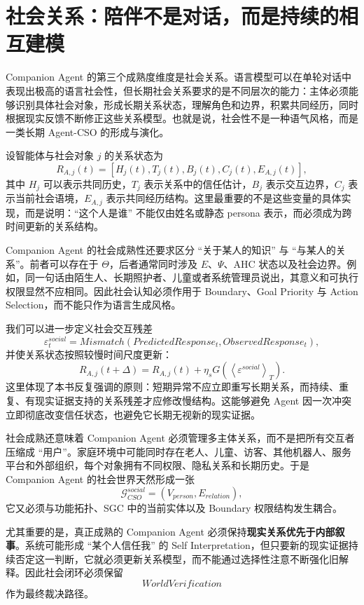 \section{社会关系：陪伴不是对话，而是持续的相互建模}

Companion Agent 的第三个成熟度维度是社会关系。语言模型可以在单轮对话中表现出极高的语言社会性，但长期社会关系要求的是不同层次的能力：主体必须能够识别具体社会对象，形成长期关系状态，理解角色和边界，积累共同经历，同时根据现实反馈不断修正这些关系模型。也就是说，社会性不是一种语气风格，而是一类长期 Agent-CSO 的形成与演化。

设智能体与社会对象 $j$ 的关系状态为
\[
R_{A,j}(t)
=
\left[
H_{j}(t),
T_{j}(t),
B_{j}(t),
C_{j}(t),
E_{A,j}(t)
\right],
\]
其中 $H_j$ 可以表示共同历史，$T_j$ 表示关系中的信任估计，$B_j$ 表示交互边界，$C_j$ 表示当前社会语境，$E_{A,j}$ 表示共同经历结构。这里最重要的不是这些变量的具体实现，而是说明：``这个人是谁'' 不能仅由姓名或静态 persona 表示，而必须成为跨时间更新的关系结构。

Companion Agent 的社会成熟性还要求区分 ``关于某人的知识'' 与 ``与某人的关系''。前者可以存在于 $\Theta$，后者通常同时涉及 $E$、$\Psi$、AHC 状态以及社会边界。例如，同一句话由陌生人、长期照护者、儿童或者系统管理员说出，其意义和可执行权限显然不应相同。因此社会认知必须作用于 Boundary、Goal Priority 与 Action Selection，而不能只作为语言生成风格。

我们可以进一步定义社会交互残差
\[
\varepsilon^{social}_t
=
Mismatch
\left(
PredictedResponse_t,
ObservedResponse_t
\right),
\]
并使关系状态按照较慢时间尺度更新：
\[
R_{A,j}(t+\Delta)
=
R_{A,j}(t)
+
\eta_s
G
\left(
\left\langle
\varepsilon^{social}
\right\rangle_T
\right).
\]
这里体现了本书反复强调的原则：短期异常不应立即重写长期关系，而持续、重复、有现实证据支持的关系残差才应修改慢结构。这能够避免 Agent 因一次冲突立即彻底改变信任状态，也避免它长期无视新的现实证据。

社会成熟还意味着 Companion Agent 必须管理多主体关系，而不是把所有交互者压缩成 ``用户''。家庭环境中可能同时存在老人、儿童、访客、其他机器人、服务平台和外部组织，每个对象拥有不同权限、隐私关系和长期历史。于是 Companion Agent 的社会世界天然形成一张
\[
\mathcal G^{social}_{CSO}
=
(V_{person},E_{relation}),
\]
它又必须与功能拓扑、SGC 中的当前实体以及 Boundary 权限结构发生耦合。

尤其重要的是，真正成熟的 Companion Agent 必须保持\textbf{现实关系优先于内部叙事}。系统可能形成 ``某个人信任我'' 的 Self Interpretation，但只要新的现实证据持续否定这一判断，它就必须更新关系模型，而不能通过选择性注意不断强化旧解释。因此社会闭环必须保留
\[
WorldVerification
\]
作为最终裁决路径。

